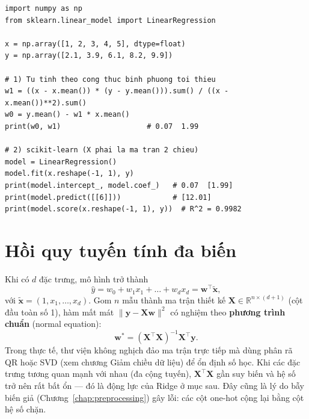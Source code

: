 \begin{lstlisting}[caption={Hồi quy tuyến tính: tự tính và dùng scikit-learn}]
import numpy as np
from sklearn.linear_model import LinearRegression

x = np.array([1, 2, 3, 4, 5], dtype=float)
y = np.array([2.1, 3.9, 6.1, 8.2, 9.9])

# 1) Tu tinh theo cong thuc binh phuong toi thieu
w1 = ((x - x.mean()) * (y - y.mean())).sum() / ((x - x.mean())**2).sum()
w0 = y.mean() - w1 * x.mean()
print(w0, w1)                    # 0.07  1.99

# 2) scikit-learn (X phai la ma tran 2 chieu)
model = LinearRegression()
model.fit(x.reshape(-1, 1), y)
print(model.intercept_, model.coef_)   # 0.07  [1.99]
print(model.predict([[6]]))            # [12.01]
print(model.score(x.reshape(-1, 1), y))  # R^2 = 0.9982
\end{lstlisting}


\section{Hồi quy tuyến tính đa biến}

Khi có $d$ đặc trưng, mô hình trở thành
\begin{equation}
    \hat{y} = w_0 + w_1 x_1 + \dots + w_d x_d = \mathbf{w}^\top \tilde{\mathbf{x}},
\end{equation}
với $\tilde{\mathbf{x}} = (1, x_1, \dots, x_d)$. Gom $n$ mẫu thành ma trận thiết kế $\mathbf{X} \in \mathbb{R}^{n \times (d+1)}$ (cột đầu toàn số 1), hàm mất mát $\|\mathbf{y} - \mathbf{X}\mathbf{w}\|^2$ có nghiệm theo \textbf{phương trình chuẩn} (normal equation):
\begin{equation}
    \mathbf{w}^{*} = (\mathbf{X}^\top \mathbf{X})^{-1} \mathbf{X}^\top \mathbf{y}.
    \label{eq:normal}
\end{equation}
Trong thực tế, thư viện không nghịch đảo ma trận trực tiếp mà dùng phân rã QR hoặc SVD (xem chương Giảm chiều dữ liệu) để ổn định số học. Khi các đặc trưng tương quan mạnh với nhau (đa cộng tuyến), $\mathbf{X}^\top\mathbf{X}$ gần suy biến và hệ số trở nên rất bất ổn --- đó là động lực của Ridge ở mục sau. Đây cũng là lý do bẫy biến giả (Chương~\ref{chap:preprocessing}) gây lỗi: các cột one-hot cộng lại bằng cột hệ số chặn.

